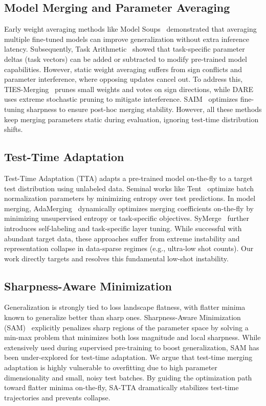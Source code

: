 \documentclass{article}
\theoremstyle{plain}
\theoremstyle{definition}
\theoremstyle{remark}
\begin{document}
\subsection{Model Merging and Parameter Averaging}
Early weight averaging methods like Model Soups~\cite{wortsman2022model} demonstrated that averaging multiple fine-tuned models can improve generalization without extra inference latency. Subsequently, Task Arithmetic~\cite{ilharco2022editing} showed that task-specific parameter deltas (task vectors) can be added or subtracted to modify pre-trained model capabilities. However, static weight averaging suffers from sign conflicts and parameter interference, where opposing updates cancel out. To address this, TIES-Merging~\cite{yadav2023ties} prunes small weights and votes on sign directions, while DARE~\cite{yu2023language} uses extreme stochastic pruning to mitigate interference. SAIM~\cite{saim2024} optimizes fine-tuning sharpness to ensure post-hoc merging stability. However, all these methods keep merging parameters static during evaluation, ignoring test-time distribution shifts.

\subsection{Test-Time Adaptation}
Test-Time Adaptation (TTA) adapts a pre-trained model on-the-fly to a target test distribution using unlabeled data. Seminal works like Tent~\cite{Wang2021TentFT} optimize batch normalization parameters by minimizing entropy over test predictions. In model merging, AdaMerging~\cite{yang2023adamerging} dynamically optimizes merging coefficients on-the-fly by minimizing unsupervised entropy or task-specific objectives. SyMerge~\cite{jung2024symerge} further introduces self-labeling and task-specific layer tuning. While successful with abundant target data, these approaches suffer from extreme instability and representation collapse in data-sparse regimes (e.g., ultra-low shot counts). Our work directly targets and resolves this fundamental low-shot instability.

\subsection{Sharpness-Aware Minimization}
Generalization is strongly tied to loss landscape flatness, with flatter minima known to generalize better than sharp ones. Sharpness-Aware Minimization (SAM)~\cite{foret2020sharpness} explicitly penalizes sharp regions of the parameter space by solving a min-max problem that minimizes both loss magnitude and local sharpness. While extensively used during supervised pre-training to boost generalization, SAM has been under-explored for test-time adaptation. We argue that test-time merging adaptation is highly vulnerable to overfitting due to high parameter dimensionality and small, noisy test batches. By guiding the optimization path toward flatter minima on-the-fly, SA-TTA dramatically stabilizes test-time trajectories and prevents collapse.
\end{document}
